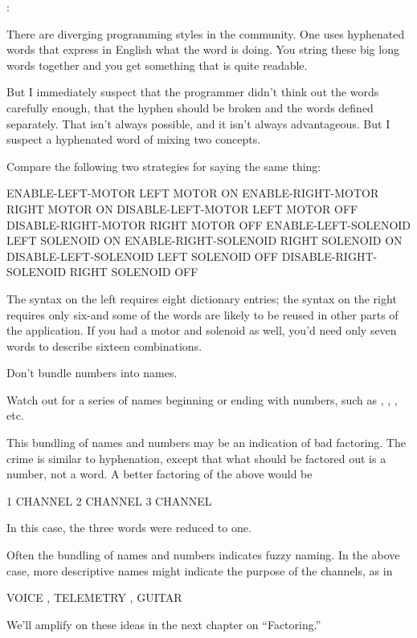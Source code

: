 \begin{interview}
:

\begin{tfquot}
There are diverging programming styles in the \Forth{} community.  One
uses hyphenated words that express in English what the word is doing.
You string these big long words together and you get something that is
quite readable.

But I immediately suspect that the programmer didn't think out the words
carefully enough, that the hyphen should be broken and the words defined
separately.  That isn't always possible, and it isn't always advantageous.
But I suspect a hyphenated word of mixing two concepts.%
\end{tfquot}
\end{interview}
Compare the following two strategies for saying the same thing:
\begin{Code}
ENABLE-LEFT-MOTOR        LEFT MOTOR ON
ENABLE-RIGHT-MOTOR       RIGHT MOTOR ON
DISABLE-LEFT-MOTOR       LEFT MOTOR OFF
DISABLE-RIGHT-MOTOR      RIGHT MOTOR OFF
ENABLE-LEFT-SOLENOID     LEFT SOLENOID ON
ENABLE-RIGHT-SOLENOID    RIGHT SOLENOID ON
DISABLE-LEFT-SOLENOID    LEFT SOLENOID OFF
DISABLE-RIGHT-SOLENOID   RIGHT SOLENOID OFF
\end{Code}
The syntax on the left requires eight dictionary entries; the syntax
on the right requires only six-and some of the words are likely to be
reused in other parts of the application.  If you had a 
motor and solenoid as well, you'd need only seven words to describe
sixteen combinations.%

\begin{tip}
Don't bundle numbers into names.
\end{tip}
Watch out for a series of names beginning or ending with numbers, such
as , , , etc.

%
This bundling of names and numbers may be an indication of bad
factoring.  The crime is similar to hyphenation, except that what
should be factored out is a number, not a word.  A better factoring of
the above would be
\begin{Code}
1 CHANNEL
2 CHANNEL
3 CHANNEL
\end{Code}
In this case, the three words were reduced to one.

Often the bundling of names and numbers indicates fuzzy naming.
In the above case, more descriptive names might indicate the purpose
of the channels, as in
\begin{Code}
VOICE , TELEMETRY , GUITAR
\end{Code}
%
We'll amplify on these ideas in the next chapter on ``Factoring.''%

